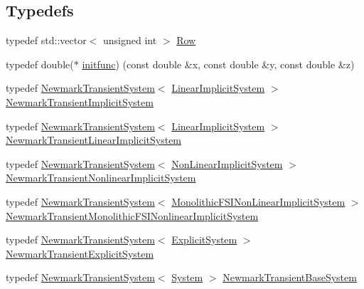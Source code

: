 \subsection*{Typedefs}
\begin{DoxyCompactItemize}
\item 
typedef std\+::vector$<$ unsigned int $>$ \mbox{\hyperlink{namespacefemus_a9d3cdeab96878814c3e8a007fb4b055f}{Row}}
\item 
typedef double($\ast$ \mbox{\hyperlink{namespacefemus_a302d9e134a6241196658a9e34bf01c21}{initfunc}}) (const double \&x, const double \&y, const double \&z)
\item 
typedef \mbox{\hyperlink{classfemus_1_1_newmark_transient_system}{Newmark\+Transient\+System}}$<$ \mbox{\hyperlink{classfemus_1_1_linear_implicit_system}{Linear\+Implicit\+System}} $>$ \mbox{\hyperlink{namespacefemus_ac999382f9621ada7702ae200bbd26084}{Newmark\+Transient\+Implicit\+System}}
\item 
typedef \mbox{\hyperlink{classfemus_1_1_newmark_transient_system}{Newmark\+Transient\+System}}$<$ \mbox{\hyperlink{classfemus_1_1_linear_implicit_system}{Linear\+Implicit\+System}} $>$ \mbox{\hyperlink{namespacefemus_ace4da87c15945c5c466b058b9f2ac33c}{Newmark\+Transient\+Linear\+Implicit\+System}}
\item 
typedef \mbox{\hyperlink{classfemus_1_1_newmark_transient_system}{Newmark\+Transient\+System}}$<$ \mbox{\hyperlink{classfemus_1_1_non_linear_implicit_system}{Non\+Linear\+Implicit\+System}} $>$ \mbox{\hyperlink{namespacefemus_a5b8a35c2b95db5c6081904c7e8c50145}{Newmark\+Transient\+Nonlinear\+Implicit\+System}}
\item 
typedef \mbox{\hyperlink{classfemus_1_1_newmark_transient_system}{Newmark\+Transient\+System}}$<$ \mbox{\hyperlink{classfemus_1_1_monolithic_f_s_i_non_linear_implicit_system}{Monolithic\+F\+S\+I\+Non\+Linear\+Implicit\+System}} $>$ \mbox{\hyperlink{namespacefemus_aab0a10b69763dee70d4d6177b73252a4}{Newmark\+Transient\+Monolithic\+F\+S\+I\+Nonlinear\+Implicit\+System}}
\item 
typedef \mbox{\hyperlink{classfemus_1_1_newmark_transient_system}{Newmark\+Transient\+System}}$<$ \mbox{\hyperlink{classfemus_1_1_explicit_system}{Explicit\+System}} $>$ \mbox{\hyperlink{namespacefemus_a71e6e02a22e2439b850a9d6f3207ad1e}{Newmark\+Transient\+Explicit\+System}}
\item 
typedef \mbox{\hyperlink{classfemus_1_1_newmark_transient_system}{Newmark\+Transient\+System}}$<$ \mbox{\hyperlink{classfemus_1_1_system}{System}} $>$ \mbox{\hyperlink{namespacefemus_aa275ff8b74e4574efb9674fd2b0c9370}{Newmark\+Transient\+Base\+System}}

\end{DoxyCompactItemize}
